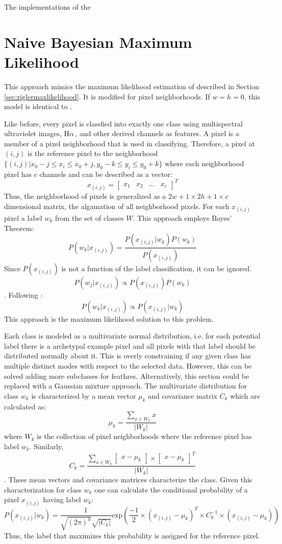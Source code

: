 \documentclass[twoside]{report}
\newcommand{\halpha}{H$\alpha$\,}
\begin{document}
The implementations of the 
\section{Naive Bayesian Maximum Likelihood}

This approach mimics the maximum likelihood estimation of \cite{rigler:2012} described in Section \ref{sec:riglermaxlikelihood}. It is modified for pixel neighborhoods. If $w=h=0$, this model is identical to \cite{rigler:2012}. 

Like before, every pixel is classfied into exactly one class using multispectral ultraviolet images, \halpha, and other derived channels as features. A pixel is a member of a pixel neighborhood that is used in classifying. Therefore, a pixel at $(i,j)$ is the reference pixel to the neighborhood $\{(i, j) | x_0 - j \le x_i \le x_0 + j, y_0 - k \le y_i \le y_0 + k\}$ where each neighborhood pixel has $c$ channels and can be described as a vector:
\[x_{(i,j)} = \begin{bmatrix} x_1 & x_2 & \hdots & x_c \end{bmatrix}^T \]
Thus, the neighborhood of pixels is generalized as a $2w + 1 \times 2h + 1 \times c$ dimensional matrix, the algamation of all neighborhood pixels. 
For each $x_{(i,j)}$ pixel a label $w_k$ from the set of classes $W$. This approach employs Bayes' Theorem:
\[ P(w_k | x_{(i,j)}) = \frac{P(x_{(i,j)} | w_k) P(w_k)}{P(x_{(i,j)})} \]
Since $P(x_{(i,j)})$ is not a function of the label classification, it can be ignored.
\[ P(w_j | x_{(i,j)}) \propto P(x_{(i,j)}) P(w_{k}) \].
Following \cite{rigler:2012}: 
\[ P(w_k | x_{(i,j)}) \propto P(x_{(i,j)} | w_k) \]
This approach is the maximum likelihood solution to this problem.

Each class is modeled as a multivariate normal distribution, i.e. for each potential label there is a archetypal example pixel and all pixels with that label should be distributed normally about it. This is overly constraining if any given class has multiple distinct modes with respect to the selected data. However, this can be solved adding more subclasses for feathres. Alternatively, this section could be replaced with a Gaussian mixture approach. The multivariate distribution for class $w_k$ is characterized by a mean vector $\mu_k$ and covariance matrix $C_k$ which are calculated as:
\[ \mu_k = \frac{\sum_{x \in W_k} x}{|W_k|} \]
where $W_k$ is the collection of pixel neighborhoods where the reference pixel has label $w_k$. Similarly,
\[ C_k = \frac{\sum_{x \in W_k} \begin{bmatrix} x - \mu_k \end{bmatrix} \times \begin{bmatrix} x - \mu_k \end{bmatrix}^T}{|W_k|} \].
These mean vectors and covariance matrices characterize the class. Given this characterization for class $w_k$ one can calculate the conditional probability of a pixel $x_{(i,j)}$ having label $w_k$:
\[ P(x_{(i,j)} | w_k) = \frac{1}{\sqrt{(2 \pi)^h} \sqrt{|C_k|}} \mathrm{exp} \left( \frac{-1}{2} \times \left(x_{(i,j)} - \mu_k \right)^T \times C_k^{-1} \times \left(x_{(i,j)} - \mu_k \right) \right) \]
Thus, the label that maximizes this probability is assigned for the reference pixel.
\end{document}
